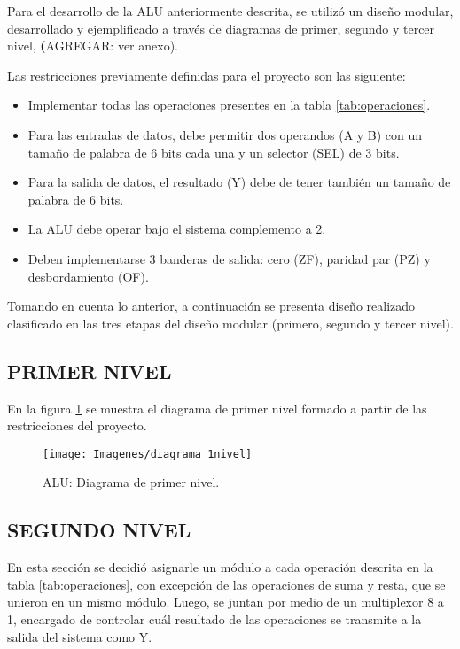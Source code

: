 \documentclass[journal,trans]{IEEEtran}
\begin{document}
Para el desarrollo de la ALU anteriormente descrita, se utilizó un diseño modular, desarrollado y ejemplificado a través de diagramas de primer, segundo y tercer nivel, \textbf(AGREGAR: ver anexo). 

Las restricciones previamente definidas para el proyecto son las siguiente:
\begin{itemize}
    \item Implementar todas las operaciones presentes en la tabla \ref{tab:operaciones}.
    \item Para las entradas de datos, debe permitir dos operandos (A y B) con un tamaño de palabra de 6 bits cada una y un selector (SEL) de 3 bits.
    \item Para la salida de datos, el resultado (Y) debe de tener también un tamaño de palabra de 6 bits.
    \item La ALU debe operar bajo el sistema complemento a 2.
    \item Deben implementarse 3 banderas de salida: cero (ZF), paridad par (PZ) y desbordamiento (OF).
\end{itemize}

Tomando en cuenta lo anterior, a continuación se presenta diseño realizado clasificado en las tres etapas del diseño modular (primero, segundo y tercer nivel).


\subsection{PRIMER NIVEL}
En la figura \ref{fig:diagrama_1nivel} se muestra el diagrama de primer nivel formado a partir de las restricciones del proyecto.

\begin{figure}[!h]
	\centering
	\texttt{[image: Imagenes/diagrama\_1nivel]}
	\caption{ALU: Diagrama de primer nivel.}
	\label{fig:diagrama_1nivel}
\end{figure}


\subsection{SEGUNDO NIVEL}
En esta sección se decidió asignarle un módulo a cada operación descrita en la tabla \ref{tab:operaciones}, con excepción de las operaciones de suma y resta, que se unieron en un mismo módulo. Luego, se juntan por medio de un multiplexor 8 a 1, encargado de controlar cuál resultado de las operaciones se transmite a la salida del sistema como Y.
\end{document}
